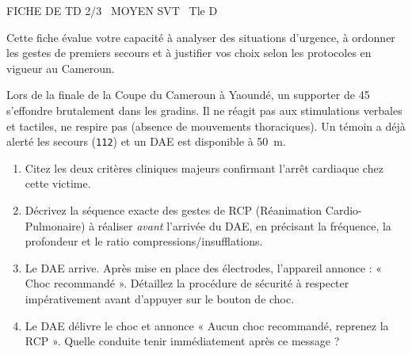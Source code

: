 \documentclass[11pt]{article}
\begin{document}
\begin{tcolorbox}[enhanced,colback=popink,colframe=popink,arc=10pt,boxrule=0pt,left=12pt,right=12pt,top=9pt,bottom=9pt]
{\color{white}\popxbold\small FICHE DE TD 2/3 \textbullet\ MOYEN \hfill SVT \textbullet\ Tle D\par}
\end{tcolorbox}
\vspace{4pt}
\noindent Cette fiche évalue votre capacité à analyser des situations d'urgence, à ordonner les gestes de premiers secours et à justifier vos choix selon les protocoles en vigueur au Cameroun.

\begin{exercice}
Lors de la finale de la Coupe du Cameroun à Yaoundé, un supporter de \SI{45}{} s'effondre brutalement dans les gradins. Il ne réagit pas aux stimulations verbales et tactiles, ne respire pas (absence de mouvements thoraciques). Un témoin a déjà alerté les secours (\texttt{112}) et un DAE est disponible à \SI{50}{\meter}.
\begin{enumerate}
    \item Citez les deux critères cliniques majeurs confirmant l'arrêt cardiaque chez cette victime.
    \item Décrivez la séquence exacte des gestes de RCP (Réanimation Cardio-Pulmonaire) à réaliser \textit{avant} l'arrivée du DAE, en précisant la fréquence, la profondeur et le ratio compressions/insufflations.
    \item Le DAE arrive. Après mise en place des électrodes, l'appareil annonce : « Choc recommandé ». Détaillez la procédure de sécurité à respecter impérativement avant d'appuyer sur le bouton de choc.
    \item Le DAE délivre le choc et annonce « Aucun choc recommandé, reprenez la RCP ». Quelle conduite tenir immédiatement après ce message ?
\end{enumerate}
\end{exercice}
\end{document}
